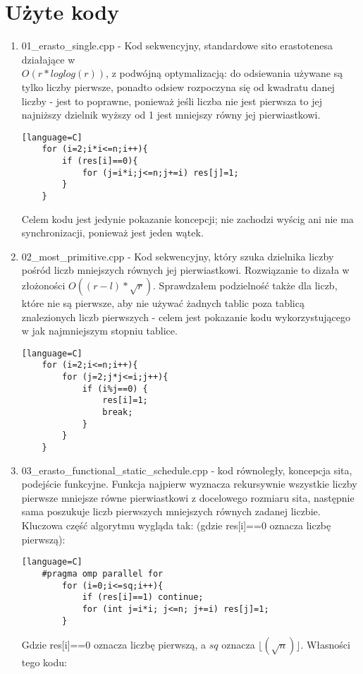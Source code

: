 \documentclass[12pt]{article}
\begin{document}
\section{Użyte kody}
\begin {enumerate}
	\item 01\_erasto\_single.cpp - Kod sekwencyjny, standardowe sito erastotenesa działające w\\ \(O(r*loglog(r))\), z podwójną optymalizacją: do odsiewania używane są tylko liczby pierwsze, ponadto odsiew rozpoczyna się od kwadratu danej liczby - jest to poprawne, ponieważ jeśli liczba nie jest pierwsza to jej najniższy dzielnik wyższy od 1 jest mniejszy równy jej pierwiastkowi.
	\begin{lstlisting}[style=mystyle, caption= Sito Erastotenesa][language=C]
	for (i=2;i*i<=n;i++){
		if (res[i]==0){
			for (j=i*i;j<=n;j+=i) res[j]=1;
		}
	}
	\end{lstlisting}
	Celem kodu jest jedynie pokazanie koncepcji; nie zachodzi wyścig ani nie ma synchronizacji, ponieważ jest jeden wątek.
	\item 02\_most\_primitive.cpp - Kod sekwencyjny, który szuka dzielnika liczby pośród liczb mniejszych równych jej pierwiastkowi. Rozwiązanie to dizała w złożoności \(O((r-l)*\sqrt{r})\). Sprawdzałem podzielność także dla liczb, które nie są pierwsze, aby nie używać żadnych tablic poza tablicą znalezionych liczb pierwszych - celem jest pokazanie kodu wykorzystującego w jak najmniejszym stopniu tablice.
	\begin{lstlisting}[style=mystyle, caption= Rozwiązanie pierwiastkowe][language=C]
	for (i=2;i<=n;i++){
		for (j=2;j*j<=i;j++){
			if (i%j==0) {
				res[i]=1;
				break;
			}
		}
	}
	\end{lstlisting}
	\item 03\_erasto\_functional\_static\_schedule.cpp - kod równoległy, koncepcja sita, podejście funkcyjne. Funkcja najpierw wyznacza rekursywnie wszystkie liczby pierwsze mniejsze równe pierwiastkowi z docelowego rozmiaru sita, następnie sama poszukuje liczb pierwszych mniejszych równych zadanej liczbie. Kluczowa część algorytmu wygląda tak: (gdzie res[i]==0 oznacza liczbę pierwszą):
	\begin{lstlisting}[style=mystyle, caption= Sito funkcyjne ze static schedulingiem][language=C]
	#pragma omp parallel for
		for (i=0;i<=sq;i++){
			if (res[i]==1) continue;
			for (int j=i*i; j<=n; j+=i) res[j]=1;
		}
	\end{lstlisting}
	Gdzie res[i]==0 oznacza liczbę pierwszą, a \(sq\) oznacza \(\lfloor(\sqrt{n})\rfloor\). Własności tego kodu:

\end{enumerate}
\end{document}
